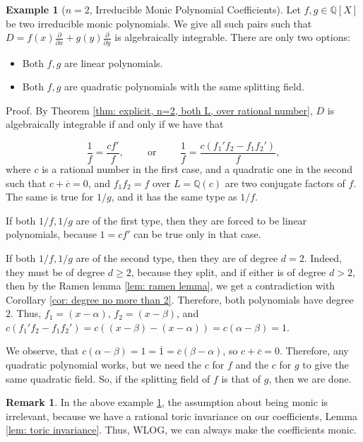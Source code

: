 \documentclass{amsart}
\theoremstyle{definition}
\newtheorem{remark}[thm]{Remark}
\newtheorem{example}[thm]{Example}
\begin{document}
\begin{example}[$n=2$, Irreducible Monic Polynomial Coefficients]\label{Ex: Irreducible Monic Polynomial Coefficients}
    Let $f,g\in \mathbb{Q}[X]$ be two irreducible monic polynomials. 
    We give all such pairs such that $D=f(x)\frac{\partial}{\partial x}+g(y)\frac{\partial}{\partial y}$ is algebraically integrable. There are only two options:

    \begin{itemize}
        \item Both $f,g$ are linear polynomials.
        \item Both $f,g$ are quadratic polynomials with the same splitting field.
    \end{itemize}
    
    Proof. By Theorem \ref{thm: explicit, n=2, both L, over rational number}, $D$ is algebraically integrable if and only if we have that 
    
    \[
    \frac{1}{f}=\frac{cf'}{f}, \hspace{1cm} \text{or} \hspace{1cm} \frac{1}{f}=\frac{c(f_1'f_2-f_1f_2')}{f},
    \]
    where $c$ is a rational number in the first case, and a quadratic one in the second such that $c+\overline{c}=0$, and $f_1f_2=f$ over $L=\mathbb{Q}(c)$ are two conjugate factors of $f$.
    The same is true for $1/g$, and it has the same type as $1/f$.

    If both $1/f,1/g$ are of the first type, then they are forced to be linear polynomials, because $1=cf'$ can be true only in that case.

    If both $1/f, 1/g$ are of the second type, then they are of degree $d= 2$. Indeed, they must be of degree $d\ge 2$, because they split, and if either is of degree $d>2$, then by the Ramen lemma \ref{lem: ramen lemma}, we get a contradiction with Corollary \ref{cor: degree no more than 2}. Therefore, both polynomials have degree $2$. Thus, $f_1=(x-\alpha)$, $f_2=(x-\beta)$, and $c(f_1'f_2-f_1f_2')=c((x-\beta)-(x-\alpha))=c(\alpha-\beta)=1$.

    We observe, that $c(\alpha-\beta)=1=\overline{1}=\overline{c}(\beta-\alpha)$, so $c+\overline{c}=0$. Therefore, any quadratic polynomial works, but we need the $c$ for $f$ and the $c$ for $g$ to give the same quadratic field. So, if the splitting field of $f$ is that of $g$, then we are done.
\end{example}

\begin{remark}
    In the above example \ref{Ex: Irreducible Monic Polynomial Coefficients}, the assumption about being monic is irrelevant, because we have a rational toric invariance on our coefficients, Lemma \ref{lem: toric invariance}. Thus, WLOG, we can always make the coefficients monic.
\end{remark}
\end{document}
